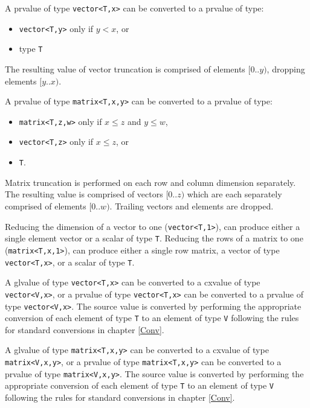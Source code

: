 \p A prvalue of type \texttt{vector<T,x>} can be converted to a prvalue of type:
\begin{itemize}
\item \texttt{vector<T,y>} only if \( y < x \), or
\item type \texttt{T}
\end{itemize}

\p The resulting value of vector truncation is comprised of elements \( [0..y)
\), dropping elements \( [y..x) \).

\p A prvalue of type \texttt{matrix<T,x,y>} can be converted to a prvalue of
type:
\begin{itemize}
  \item \texttt{matrix<T,z,w>} only if \( x \leq z \) and \(y \leq w \),
  \item \texttt{vector<T,z>} only if \( x \leq z \), or
  \item \texttt{T}.
\end{itemize}

\p Matrix truncation is performed on each row and column dimension separately.
The resulting value is comprised of vectors \( [0..z) \) which are each
separately comprised of elements \( [0..w) \). Trailing vectors and elements are
dropped.

\p Reducing the dimension of a vector to one (\texttt{vector<T,1>}), can produce
either a single element vector or a scalar of type \texttt{T}. Reducing the
rows of a matrix to one (\texttt{matrix<T,x,1>}), can produce either a single
row matrix, a vector of type \texttt{vector<T,x>}, or a scalar of type
\texttt{T}.


\p A glvalue of type \texttt{vector<T,x>} can be converted to a cxvalue of type
\texttt{vector<V,x>}, or a prvalue of type \texttt{vector<T,x>} can be converted
to a prvalue of type \texttt{vector<V,x>}. The source value is converted by
performing the appropriate conversion of each element of type \texttt{T} to an
element of type \texttt{V} following the rules for standard conversions
in chapter \ref{Conv}.

\p A glvalue of type \texttt{matrix<T,x,y>} can be converted to a cxvalue of
type \texttt{matrix<V,x,y>}, or a prvalue of type \texttt{matrix<T,x,y>} can be
converted to a prvalue of type \texttt{matrix<V,x,y>}. The source value is
converted by performing the appropriate conversion of each element of type
\texttt{T} to an element of type \texttt{V} following the rules for standard
conversions in chapter \ref{Conv}.

